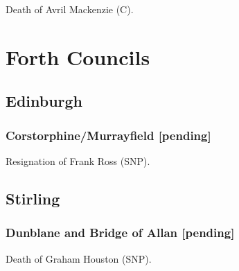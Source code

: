\documentclass[a4paper,openany]{book}
\begin{document}
\begin{resultsiii}

Death of Avril Mackenzie (C).

%
%

\section{Forth Councils}

\subsection*{Edinburgh}

\subsubsection*{Corstorphine\slash Murrayfield \hspace*{\fill}\nolinebreak[1]%
	\enspace\hspace*{\fill}
	[pending]}


Resignation of Frank Ross (SNP).

\subsection*{Stirling}

\subsubsection*{Dunblane and Bridge of Allan \hspace*{\fill}\nolinebreak[1]%
	\enspace\hspace*{\fill}
	[pending]}


Death of Graham Houston (SNP).

\end{resultsiii}
\end{document}
